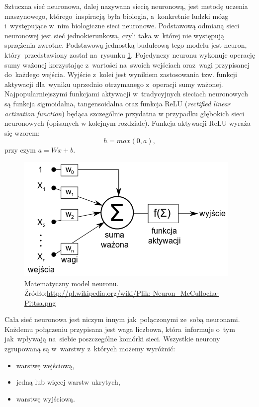 Sztuczna sieć neuronowa, dalej nazywana siecią neuronową, jest metodę uczenia maszynowego, którego~inspiracją była biologia, a~konkretnie ludzki mózg i~występujące w~nim biologiczne sieci neuronowe. Podstawową odmianą sieci neuronowej jest sieć jednokierunkowa, czyli taka w~której nie występują sprzężenia zwrotne. Podstawową jednostką budulcową tego modelu jest neuron, który~przedstawiony został na~rysunku \ref{neuron}. Pojedynczy neuronu wykonuje operację sumy ważonej korzystając z~wartości na~swoich wejściach oraz~wagi przypisanej do~każdego wejścia. Wyjście z~kolei jest wynikiem zastosowania tzw. funkcji aktywacji dla~wyniku uprzednio otrzymanego z~operacji sumy ważonej. Najpopularniejszymi funkcjami aktywacji w~tradycyjnych sieciach neuronowych są funkcja sigmoidalna, tangensoidalna oraz funkcja ReLU (\textit{rectified linear activation function}) będąca szczególnie przydatna w przypadku głębokich sieci neuronowych (opisanych w kolejnym rozdziale). Funkcja aktywacji ReLU wyraża się wzorem:
\begin{equation}
h=max(0,a),
\end{equation}
 przy czym $a=Wx+b$.
 
\begin{figure}[ht!]
\centering
\includegraphics{res/neuron.png}
\caption[Caption for LOF]{Matematyczny model neuronu. Źródło:\url{http://pl.wikipedia.org/wiki/Plik:
Neuron_McCullocha-Pittsa.png}\label{neuron}}
\end{figure} 

\noindent
Cała sieć neuronowa jest niczym innym jak~połączonymi ze~sobą neuronami. Każdemu połączeniu przypisana jest waga liczbowa, która~informuje o~tym jak~wpływają na~siebie poszczególne komórki sieci. Wszystkie neurony zgrupowaną są w~warstwy z~których możemy wyróżnić:
\begin{itemize}
\item warstwę wejściową,
\item jedną lub więcej warstw ukrytych,
\item warstwę wyjściową.
\end{itemize}

